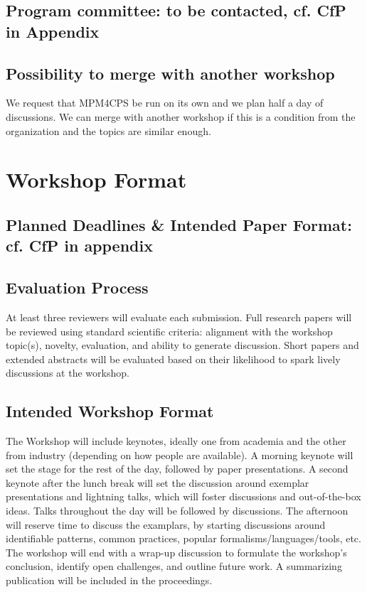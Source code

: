 \subsection{Program committee: to be contacted, cf. CfP in Appendix}

\subsection{Possibility to merge with another workshop}
We request that MPM4CPS be run on its own and we plan half a day of discussions.
We can merge with another workshop if this is a condition from the organization 
and the topics are similar enough.

\section{Workshop Format}
\subsection{Planned Deadlines \& Intended Paper Format: cf. CfP in appendix}

\subsection{Evaluation Process}
At least three reviewers will evaluate each submission.
Full research papers will be reviewed using standard scientific criteria: alignment 
with the workshop topic(s), novelty, evaluation, and ability to generate discussion.
Short papers and extended abstracts will be evaluated based on their likelihood 
to spark lively discussions at the workshop.

\subsection{Intended Workshop Format}
The Workshop will include keynotes, ideally one from academia and the other from industry
(depending on how people are available). A morning keynote will set the stage for the
rest of the day, followed by paper presentations. A second keynote after the lunch break
will set the discussion around exemplar presentations and lightning talks, which will
foster discussions and out-of-the-box ideas.
Talks throughout the day will be followed by discussions. The afternoon will reserve
time to discuss the examplars, by starting discussions around identifiable patterns,
common practices, popular formalisms/languages/tools, etc. 
The workshop will end with a wrap-up discussion to formulate the workshop's 
conclusion, identify open challenges, and outline future work.
A summarizing publication will be included in the proceedings.

